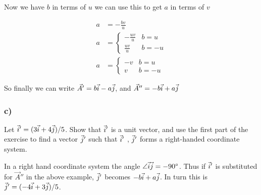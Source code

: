 \documentclass[main.tex]{subfiles}
\begin{document}
Now we have $b$ in terms of $u$ we can use this to get $a$ in terms
of $v$

\begin{align*}
a &= -\frac{bv}{u}\\
a &= \begin{cases}
      -\frac{uv}{u} & b= u \\
      \frac{uv}{u} & b= -u
   \end{cases}\\
a &= \begin{cases}
      -v & b= u \\
      v & b= -u
   \end{cases}
\end{align*}

So finally we can write $\vec{A}' = b\vec{i} - a\vec{j}$, and $\vec{A}'' = -b
\vec{i} + a\vec{j}$


\subsubsection*{c)}
Let $\vec{i}' =(3\vec{i} +4\vec{j})/5$. Show that $\vec{i}'$
is a unit vector, and use the first part of the exercise to find a vector $
\vec{j}'$ such that $\vec{i}'$ , $\vec{j}'$ forms a right-handed coordinate system.

In a right hand coordinate system the angle $\angle\vec{i}\vec{j} = \ang{-90}$.
Thus if $\vec{i}'$ is substituted for $\vec{A}''$ in the above example, $
\vec{j}'$ becomes $-b\vec{i} + a\vec{j}$.
In turn this is $\vec{j}' = (-4\vec{i} + 3\vec{j})/5$.
\end{document}
